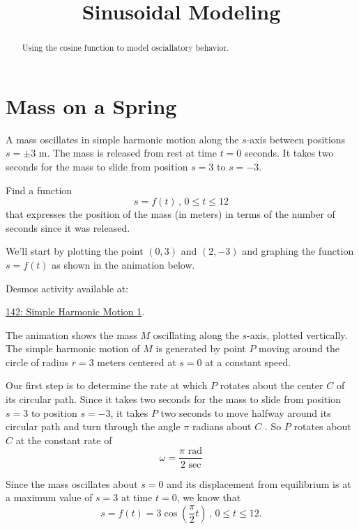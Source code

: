 \documentclass{ximera}
\title{Sinusoidal Modeling}
\begin{document}
\begin{abstract}
Using the cosine function to model osciallatory behavior.
\end{abstract}
\maketitle


\section{Mass on a Spring}
\begin{example}  \label{Efdbgthyn}
A mass oscillates in simple harmonic motion along the $s$-axis between positions $s=\pm 3$ m. The mass is released from rest at time $t=0$ seconds. It takes two seconds for the mass to slide from position $s=3$ to $s=-3$. 

Find a function
\[
   s = f(t) \, , \, 0\leq t \leq 12
\]  
that expresses the position of the mass (in meters) in terms of the number of seconds since it was released.

\begin{explanation}


We'll start by plotting the point $(0,3)$ and $(2,-3)$ and graphing the function $s=f(t)$ as shown in the animation below. 

Desmos activity available at:

\href{https://www.desmos.com/calculator/yaopsldty0}{142: Simple Harmonic Motion 1}.

 
\begin{onlineOnly}
    \begin{center}
\end{center}
\end{onlineOnly}

The animation shows the mass $M$ oscillating along the $s$-axis, plotted vertically. The simple harmonic motion of $M$ is generated by point $P$ moving around the circle of radius $r=3$ meters centered at $s=0$ at a constant speed. 

Our first step is to determine the rate at which $P$ rotates about the center $C$ of its circular path. Since it takes two seconds for the mass to slide from position $s=3$ to position $s=-3$, it takes $P$ two seconds to move halfway around its circular path and turn through the angle $\pi$ radians about $C$ . So $P$ rotates about $C$ at the constant rate of
\[
  \omega = \frac{\pi \text{ rad}}{2 \text{ sec}} %
\]   


Since the mass oscillates about $s=0$ and its displacement from equilibrium is at a maximum value of $s=3$ at time $t=0$, we know that  
\[
  s = f(t) = 3\cos\left( \frac{\pi}{2}t \right) \, , \, 0\leq t \leq 12.
\]

\end{explanation}


\end{example}
\end{document}
